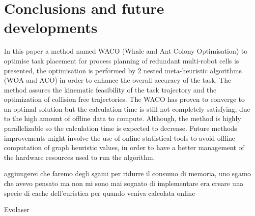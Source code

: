 \documentclass[twocolumn]{svjour3}
\newcommand{\rev}[1]{\textcolor{verde}{#1}}
\begin{document}
\section{Conclusions and future developments}
\label{conclusions}

In this paper a method named WACO (Whale and Ant Colony Optimisation) to optimise task placement for process planning of redundant multi-robot cells is presented, the optimisation is performed by 2 nested meta-heuristic algorithms (WOA and ACO) in order to enhance the overall accuracy of the task. The method assures the kinematic feasibility of the task trajectory and the optimization of collision free trajectories. The WACO has proven to converge to an optimal solution but the calculation time is still not completely satisfying, due to the high amount of offline data to compute. Although, the method is highly parallelizable so the calculation time is expected to decrease.
Future methods improvements might involve the use of online statistical tools to avoid offline computation of graph heuristic values, in order to have a better management of the hardware resources used to run the algorithm.

\rev{aggiungerei che faremo degli sgami per ridurre il consumo di memoria, uno sgamo che avevo pensato ma non mi sono mai sognato di implementare era creare una specie di cache dell'euristica per quando veniva calcolata online}

\begin{acknowledgements}
Evolaser
\end{acknowledgements}



\end{document}
